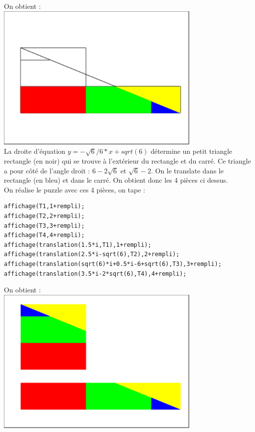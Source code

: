 \documentclass[a4paper,11pt]{book}
\begin{document}
On obtient :\\
\includegraphics[width=10cm]{carresqrt65}\\
La droite d'\'equation $y=-\sqrt 6/6*x+sqrt(6)$ d\'etermine un petit triangle 
rectangle (en noir) qui se trouve \`a l'ext\'erieur du rectangle et du carr\'e.
Ce triangle a pour c\^ot\'e de l'angle droit : $6-2\sqrt 6$ et $\sqrt 6-2$.
On le translate dans le rectangle (en bleu) et dans le carr\'e.
On obtient donc les 4 pi\`eces ci dessus.\\
On r\'ealise le puzzle avec ces 4 pi\`eces, on tape :
\begin{verbatim}
affichage(T1,1+rempli);
affichage(T2,2+rempli);
affichage(T3,3+rempli);
affichage(T4,4+rempli);
affichage(translation(1.5*i,T1),1+rempli);
affichage(translation(2.5*i-sqrt(6),T2),2+rempli);
affichage(translation(sqrt(6)*i+0.5*i-6+sqrt(6),T3),3+rempli);
affichage(translation(3.5*i-2*sqrt(6),T4),4+rempli);
\end{verbatim}
On obtient :\\
\includegraphics[width=10cm]{carresqrt66}
\end{document}
